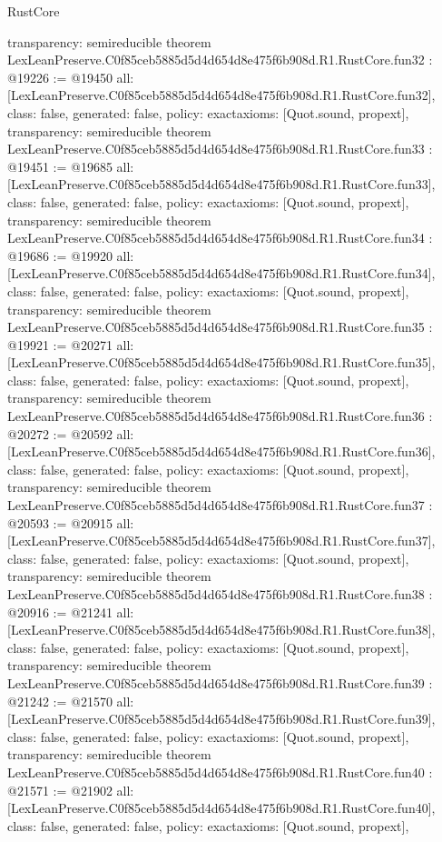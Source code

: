 \begin{lexlean}{RustCore}
\begin{coremodule}
{  transparency: semireducible
}
theorem LexLeanPreserve.C0f85ceb5885d5d4d654d8e475f6b908d.R1.RustCore.fun32 : @19226 := @19450 {
  all: [LexLeanPreserve.C0f85ceb5885d5d4d654d8e475f6b908d.R1.RustCore.fun32],
  class: false,
  generated: false,
  policy: exact{axioms: [Quot.sound, propext]},
  transparency: semireducible
}
theorem LexLeanPreserve.C0f85ceb5885d5d4d654d8e475f6b908d.R1.RustCore.fun33 : @19451 := @19685 {
  all: [LexLeanPreserve.C0f85ceb5885d5d4d654d8e475f6b908d.R1.RustCore.fun33],
  class: false,
  generated: false,
  policy: exact{axioms: [Quot.sound, propext]},
  transparency: semireducible
}
theorem LexLeanPreserve.C0f85ceb5885d5d4d654d8e475f6b908d.R1.RustCore.fun34 : @19686 := @19920 {
  all: [LexLeanPreserve.C0f85ceb5885d5d4d654d8e475f6b908d.R1.RustCore.fun34],
  class: false,
  generated: false,
  policy: exact{axioms: [Quot.sound, propext]},
  transparency: semireducible
}
theorem LexLeanPreserve.C0f85ceb5885d5d4d654d8e475f6b908d.R1.RustCore.fun35 : @19921 := @20271 {
  all: [LexLeanPreserve.C0f85ceb5885d5d4d654d8e475f6b908d.R1.RustCore.fun35],
  class: false,
  generated: false,
  policy: exact{axioms: [Quot.sound, propext]},
  transparency: semireducible
}
theorem LexLeanPreserve.C0f85ceb5885d5d4d654d8e475f6b908d.R1.RustCore.fun36 : @20272 := @20592 {
  all: [LexLeanPreserve.C0f85ceb5885d5d4d654d8e475f6b908d.R1.RustCore.fun36],
  class: false,
  generated: false,
  policy: exact{axioms: [Quot.sound, propext]},
  transparency: semireducible
}
theorem LexLeanPreserve.C0f85ceb5885d5d4d654d8e475f6b908d.R1.RustCore.fun37 : @20593 := @20915 {
  all: [LexLeanPreserve.C0f85ceb5885d5d4d654d8e475f6b908d.R1.RustCore.fun37],
  class: false,
  generated: false,
  policy: exact{axioms: [Quot.sound, propext]},
  transparency: semireducible
}
theorem LexLeanPreserve.C0f85ceb5885d5d4d654d8e475f6b908d.R1.RustCore.fun38 : @20916 := @21241 {
  all: [LexLeanPreserve.C0f85ceb5885d5d4d654d8e475f6b908d.R1.RustCore.fun38],
  class: false,
  generated: false,
  policy: exact{axioms: [Quot.sound, propext]},
  transparency: semireducible
}
theorem LexLeanPreserve.C0f85ceb5885d5d4d654d8e475f6b908d.R1.RustCore.fun39 : @21242 := @21570 {
  all: [LexLeanPreserve.C0f85ceb5885d5d4d654d8e475f6b908d.R1.RustCore.fun39],
  class: false,
  generated: false,
  policy: exact{axioms: [Quot.sound, propext]},
  transparency: semireducible
}
theorem LexLeanPreserve.C0f85ceb5885d5d4d654d8e475f6b908d.R1.RustCore.fun40 : @21571 := @21902 {
  all: [LexLeanPreserve.C0f85ceb5885d5d4d654d8e475f6b908d.R1.RustCore.fun40],
  class: false,
  generated: false,
  policy: exact{axioms: [Quot.sound, propext]},
}
\end{coremodule}
\end{lexlean}
